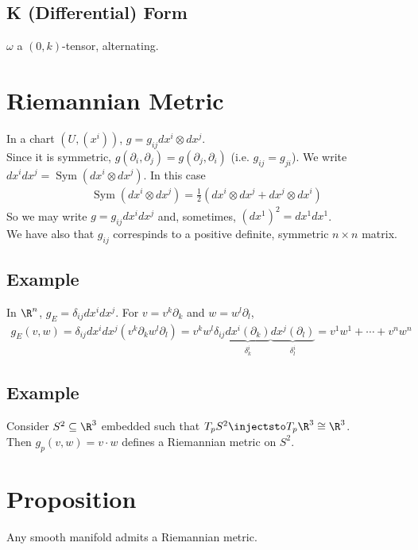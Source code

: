 \documentclass[11pt]{article}
\begin{document}
\subsection*{K (Differential) Form}
\label{sec:orge5e2e12}
\(\omega\) a \((0,k)\)-tensor, alternating.\\
\section*{Riemannian Metric}
\label{sec:org64241ba}
In a chart \((U,(x^{i}))\), \(g=g_{ij}dx^{i}\otimes dx^{j}\).\\
Since it is symmetric, \(g(\partial_{i},\partial_{j})=g(\partial_{j},\partial_{i})\) (i.e. \(g_{ij}=g_{ji}\)). We write \(dx^{i}dx^{j}=\operatorname{Sym}(dx^{i}\otimes dx^{j})\). In this case\\
\begin{align*}
  \operatorname{Sym}(dx^{i}\otimes dx^{j})
  =\frac{1}{2}\left( dx^{i}\otimes dx^{j}+dx^{j}\otimes dx^{i} \right)
\end{align*}
So we may write \(g=g_{ij}dx^{i}dx^{j}\) and, sometimes, \((dx^{1})^{2}=dx^{1}dx^{1}\).\\
We have also that \(g_{ij}\) correspinds to a positive definite, symmetric \(n\times n\) matrix.\\
\subsection*{Example}
\label{sec:org0454b47}
In \(\R^{n}\), \(g_{E}=\delta_{ij}dx^{i}dx^{j}\). For \(v=v^{k}\partial_{k}\) and \(w=w^{l}\partial_{l}\),\\
\begin{align*}
  g_{E}(v,w)
  =\delta_{ij}dx^{i}dx^{j}(v^{k}\partial_{k}w^{l}\partial_{l})
  =v^{k}w^{l}\delta_{ij}\underbrace{dx^{i}(\partial_{k})}_{\delta_{k}^{i}}\underbrace{dx^{j}(\partial_{l})}_{\delta_{l}^{i}}
  =v^{1}w^{1}+\cdots+v^{n}w^{n}
\end{align*}
\subsection*{Example}
\label{sec:org5154a0e}
Consider \(S^{2}\subseteq\R^{3}\) embedded such that \(T_{p}S^{2}\injectsto T_{p}\R^{3}\cong\R^{3}\).\\
Then \(g_{p}(v,w)=v\cdot w\) defines a Riemannian metric on \(S^{2}\).\\
\section*{Proposition}
\label{sec:orge357c40}
Any smooth manifold admits a Riemannian metric.\\
\end{document}
